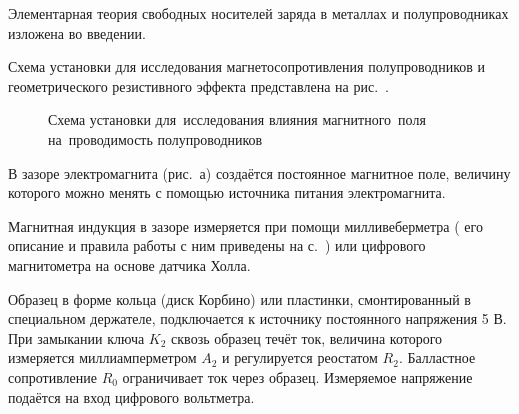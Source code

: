 


Элементарная теория свободных носителей заряда в металлах и полупроводниках изложена во введении.

\experiment Схема установки для исследования магнетосопротивления полупроводников и геометрического резистивного эффекта представлена на рис.~.
\begin{figure}[h!]
	\caption{Схема установки для~исследования влияния магнитного~поля на~проводимость полупроводников}
\end{figure}

В зазоре электромагнита (рис.~а) создаётся постоянное магнитное поле, величину которого можно менять с помощью источника питания электромагнита.

Магнитная индукция в зазоре измеряется при помощи милливеберметра ( его описание и правила работы с ним приведены на с.~\pageref{MWB}) или цифрового магнитометра на основе датчика Холла.

Образец в форме кольца (диск Корбино) или пластинки, смонтированный в специальном держателе, подключается к источнику постоянного напряжения 5 В. При замыкании ключа $K_2$ сквозь образец течёт ток, величина которого измеряется миллиамперметром $A_2$ и регулируется реостатом $R_2$. Балластное сопротивление $R_0$ ограничивает ток через образец. Измеряемое напряжение подаётся на вход цифрового вольтметра.

